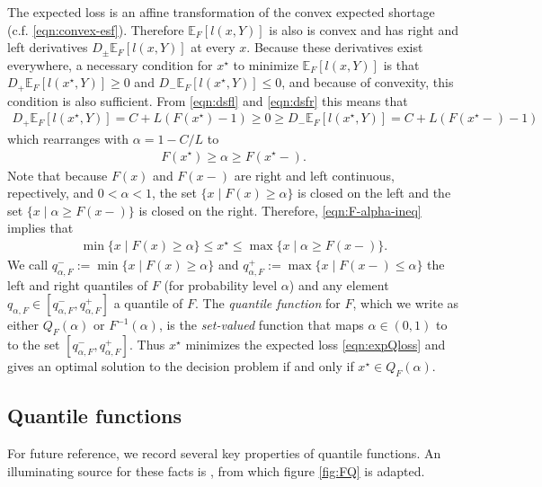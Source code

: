 \documentclass{article}\usepackage[]{graphicx}\usepackage[]{xcolor}
\begin{document}
The expected loss is an affine transformation of the convex expected shortage (c.f. \eqref{eqn:convex-esf}). Therefore
$\mathbb{E}_{F}[l(x,Y)]$ is also is convex and has right and left derivatives $D_{\pm}\mathbb{E}_{F}[l(x,Y)]$ at every $x$. 
Because these derivatives exist everywhere, a necessary condition for $x^{\star}$ to
minimize $\mathbb{E}_{F}[l(x,Y)]$ is that $D_{+}\mathbb{E}_{F}[l(x^{\star},Y)] \geq 0$ and 
$D_{-}\mathbb{E}_{F}[l(x^{\star},Y)] \leq 0$, and because of convexity, this condition is also sufficient. From \eqref{eqn:dsfl} 
and \eqref{eqn:dsfr} this means that
\begin{align}
D_{+}\mathbb{E}_{F}[l(x^{\star},Y)] = C + L(F(x^{\star}) - 1) \geq 0 \geq 
D_{-}\mathbb{E}_{F}[l(x^{\star},Y)] = C + L(F(x^{\star}-) - 1) \label{eqn:expQd-ineq}
\end{align}
which rearranges with $\alpha = 1-C/L$ to 
\begin{align}
F(x^{\star}) \geq \alpha \geq F(x^{\star}-). \label{eqn:F-alpha-ineq}
\end{align}
Note that because $F(x)$ and $F(x-)$ are right and left continuous, repectively, and $0<\alpha <1$, the set 
$\{x \mid F(x) \geq \alpha\}$ is closed
on the left and the set $\{x \mid \alpha \geq F(x-)\}$ is closed on the right.
Therefore, \eqref{eqn:F-alpha-ineq} implies that
\begin{align}
\min\{x \mid F(x) \geq \alpha\}  \leq x^{\star} \leq \max\{x \mid \alpha \geq F(x-)\}. \label{eqn:set-alpha-ineq}
\end{align}
We call $q^{-}_{\alpha, F} := \min\{x \mid F(x) \geq \alpha\}$ and $q^{+}_{\alpha, F} := \max\{x \mid F(x-) \leq \alpha\}$
the left and right quantiles of $F$ (for probability level $\alpha$) and any element $q_{\alpha, F} \in [q^{-}_{\alpha, F}, q^{+}_{\alpha, F}]$
a quantile of $F$.  The \emph{quantile function} for $F$, which we write as either $Q_F(\alpha)$ or $F^{-1}(\alpha)$, is the 
\emph{set-valued} function that maps $\alpha \in (0,1)$ to to the set $[q^{-}_{\alpha, F}, q^{+}_{\alpha, F}]$. 
Thus $x^{\star}$ minimizes the expected loss \eqref{eqn:expQloss} and gives an optimal solution to the decision problem
if and only if $x^{\star} \in Q_F(\alpha)$.

\subsection{Quantile functions}
\label{sec:quantile-functions} 

For future reference, we record several key properties of quantile functions. An illuminating source for these
facts is \cite{rockafellar2014random}, from which figure \ref{fig:FQ} is adapted.
\end{document}
